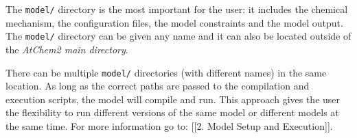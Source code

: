 The \texttt{model/} directory is the most important for the user: it
includes the chemical mechanism, the configuration files, the model
constraints and the model output. The \texttt{model/} directory can be
given any name and it can also be located outside of the \emph{AtChem2
main directory}.

There can be multiple \texttt{model/} directories (with different names)
in the same location. As long as the correct paths are passed to the
compilation and execution scripts, the model will compile and run. This
approach gives the user the flexibility to run different versions of the
same model or different models at the same time. For more information go
to: {[}{[}2. Model Setup and Execution{]}{]}.
